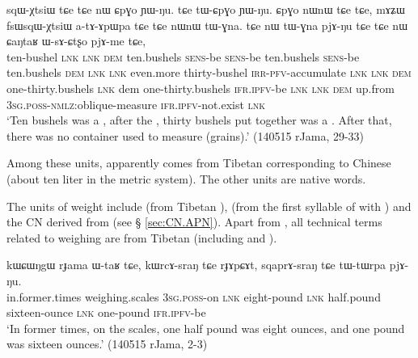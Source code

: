 \begin{exe}
\ex \label{ex:sqWXtsiW}
\gll sqɯ-χtsiɯ tɕe tɕe nɯ ɕpɣo ɲɯ-ŋu. tɕe tɯ-ɕpɣo ɲɯ-ŋu. ɕpɣo nɯnɯ tɕe tɕe, mɤʑɯ fsɯsqɯ-χtsiɯ a-tɤ-ɤpɯpa tɕe tɕe nɯnɯ tɯ-ɣna. tɕe nɯ tɯ-ɣna pjɤ-ŋu tɕe tɕe nɯ ɕaŋtaʁ ɯ-sɤ-ɕtʂo pjɤ-me tɕe, \\
ten-bushel \textsc{lnk} \textsc{lnk} \textsc{dem} ten.bushels \textsc{sens}-be \textsc{sens}-be ten.bushels \textsc{sens}-be ten.bushels  \textsc{dem} \textsc{lnk} \textsc{lnk} even.more thirty-bushel \textsc{irr}-\textsc{pfv}-accumulate \textsc{lnk} \textsc{lnk} \textsc{dem} one-thirty.bushels  \textsc{lnk} dem one-thirty.bushels \textsc{ifr}.\textsc{ipfv}-be \textsc{lnk} \textsc{lnk} \textsc{dem} up.from \textsc{3sg}.\textsc{poss}-\textsc{nmlz}:oblique-measure \textsc{ifr}.\textsc{ipfv}-not.exist \textsc{lnk} \\
\glt  `Ten bushels was a , after the , thirty bushels put together was a  . After that, there was no container used to measure (grains).'  (140515 rJama, 29-33)
\end{exe}

Among these units,  apparently comes from Tibetan  corresponding to Chinese  (about ten liter in the metric system). The other units are native words.

The units of weight include  (from Tibetan ),   (from the first syllable of  with ) and the CN  derived from  (see § \ref{sec:CN.APN}). Apart from , all technical terms related to weighing are from Tibetan (including  and ).

\begin{exe}
\ex \label{ex:sqaprAsrang}
\gll kɯɕɯŋgɯ rɟama ɯ-taʁ tɕe, kɯrcɤ-sraŋ tɕe rɟɤpɕɤt,  sqaprɤ-sraŋ tɕe tɯ-tɯrpa pjɤ-ŋu. \\
in.former.times weighing.scales \textsc{3sg}.\textsc{poss}-on \textsc{lnk} eight-pound \textsc{lnk} half.pound sixteen-ounce \textsc{lnk} one-pound \textsc{ifr}.\textsc{ipfv}-be \\
\glt  `In former times, on the scales, one half pound was eight ounces, and one pound was sixteen ounces.' (140515 rJama, 2-3)
\end{exe}
 

